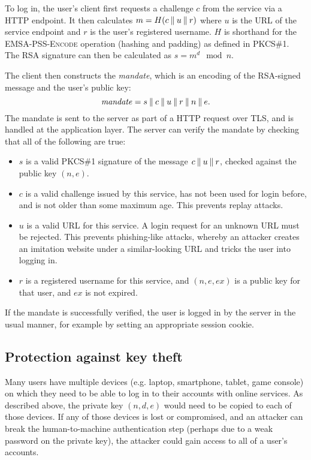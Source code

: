 To log in, the user's client first requests a challenge $c$ from the service via a HTTP
endpoint. It then calculates $m = H(c \mathbin{\|} u \mathbin{\|} r)$ where $u$ is the URL of the service endpoint and
$r$ is the user's registered username. $H$ is shorthand for the \textsc{EMSA-PSS-Encode} operation
(hashing and padding) as defined in PKCS\#1.~\cite{PKCS1} The RSA signature can then be calculated
as $s = m^d \mod n$.

The client then constructs the \emph{mandate}, which is an encoding of the RSA-signed message and
the user's public key: $$\mathit{mandate} = s \mathbin{\|} c \mathbin{\|} u \mathbin{\|} r \mathbin{\|} n \mathbin{\|} e.$$
The mandate is sent to the server as part of a HTTP request over TLS, and is handled at the
application layer. The server can verify the mandate by checking that all of the following are true:
\begin{itemize}
\item $s$ is a valid PKCS\#1 signature of the message $c \mathbin{\|} u \mathbin{\|} r$, checked against the
public key $(n, e)$.
\item $c$ is a valid challenge issued by this service, has not been used for login before, and is
not older than some maximum age. This prevents replay attacks.
\item $u$ is a valid URL for this service. A login request for an unknown URL must be rejected.
This prevents phishing-like attacks, whereby an attacker creates an imitation website under a
similar-looking URL and tricks the user into logging in.
\item $r$ is a registered username for this service, and $(n, e, \mathit{ex})$ is a public key for
that user, and $\mathit{ex}$ is not expired.
\end{itemize}
If the mandate is successfully verified, the user is logged in by the server in the usual manner,
for example by setting an appropriate session cookie.

\subsection{Protection against key theft}\label{sec:revocation}

Many users have multiple devices (e.g. laptop, smartphone, tablet, game console) on which they need
to be able to log in to their accounts with online services. As described above, the private key
$(n, d, e)$ would need to be copied to each of those devices. If any of those devices is lost or
compromised, and an attacker can break the human-to-machine authentication step (perhaps due to a
weak password on the private key), the attacker could gain access to all of a user's accounts.

